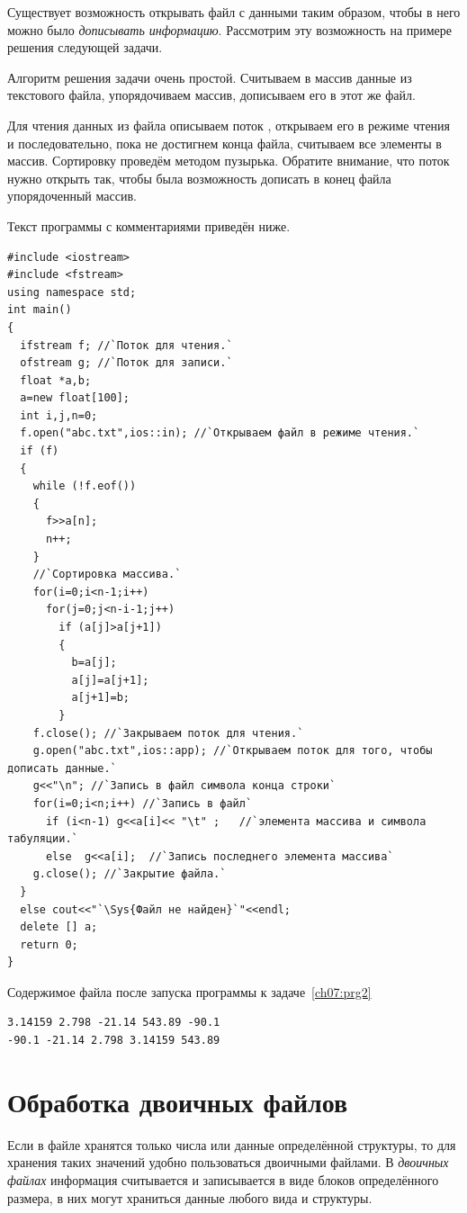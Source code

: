 Существует возможность открывать файл с данными таким образом, чтобы в него можно было \emph{дописывать
информацию}. Рассмотрим эту возможность на примере решения следующей задачи.


Алгоритм решения задачи очень простой. Считываем в массив данные из текстового файла, упорядочиваем массив, дописываем
его в этот же файл.

Для чтения данных из файла описываем поток , открываем его в режиме чтения и последовательно,
пока не достигнем конца файла, считываем все элементы в массив. Сортировку проведём методом пузырька. Обратите
внимание, что поток нужно открыть так, чтобы была возможность дописать в конец файла упорядоченный массив.

Текст программы с комментариями приведён ниже. %
\begin{lstlisting}
#include <iostream>
#include <fstream>
using namespace std;
int main()
{
  ifstream f; //`Поток для чтения.`
  ofstream g; //`Поток для записи.`
  float *a,b;
  a=new float[100];
  int i,j,n=0;
  f.open("abc.txt",ios::in); //`Открываем файл в режиме чтения.`
  if (f)	
  {
    while (!f.eof())
    {
      f>>a[n];
      n++;
    }
    //`Сортировка массива.`
    for(i=0;i<n-1;i++)
      for(j=0;j<n-i-1;j++)
        if (a[j]>a[j+1])
        {
          b=a[j];
          a[j]=a[j+1];
          a[j+1]=b;
        }
    f.close(); //`Закрываем поток для чтения.`
    g.open("abc.txt",ios::app); //`Открываем поток для того, чтобы дописать данные.`
    g<<"\n"; //`Запись в файл символа конца строки` 
    for(i=0;i<n;i++) //`Запись в файл`
      if (i<n-1) g<<a[i]<< "\t" ;	//`элемента массива и символа табуляции.`
      else  g<<a[i];  //`Запись последнего элемента массива`
    g.close(); //`Закрытие файла.`
  }
  else cout<<"`\Sys{Файл не найден}`"<<endl;
  delete [] a;
  return 0;
}
\end{lstlisting}

Содержимое файла  после запуска программы к задаче~\ref{ch07:prg2}
\begin{verbatim}
3.14159 2.798 -21.14 543.89 -90.1
-90.1 -21.14 2.798 3.14159 543.89
\end{verbatim}


\section[Обработка двоичных файлов]{Обработка двоичных файлов}
Если в файле хранятся только числа или данные определённой структуры, то для хранения таких значений удобно пользоваться
двоичными файлами. В \emph{двоичных файлах} информация считывается и записывается в
виде блоков определённого размера, в них могут храниться данные любого вида и структуры.

